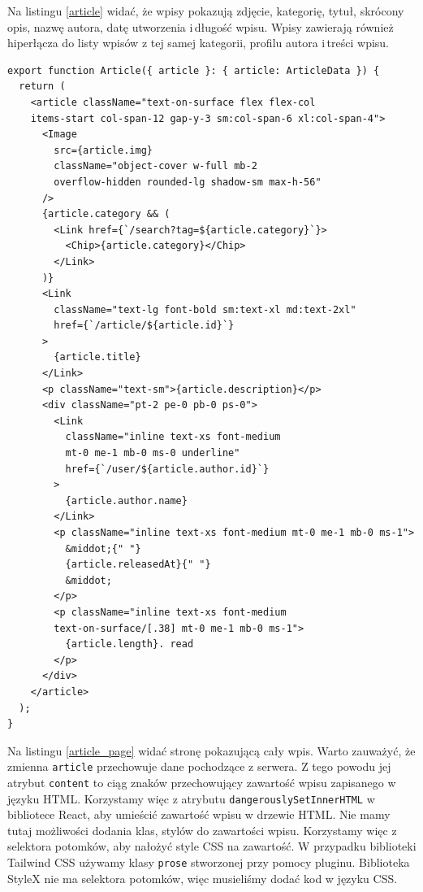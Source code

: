 \documentclass[a4paper,12pt]{book} %
\begin{document}
Na listingu \ref{article} widać, że wpisy pokazują zdjęcie, kategorię, tytuł, skrócony opis, nazwę autora, datę utworzenia i\,długość wpisu. Wpisy zawierają również hiperłącza do listy wpisów z tej samej kategorii, profilu autora i\,treści wpisu.


\begin{lstfloat}[hb]
  \lstset{language=HTML}
  \begin{lstlisting}[frame=single]
export function Article({ article }: { article: ArticleData }) {
  return (
    <article className="text-on-surface flex flex-col
    items-start col-span-12 gap-y-3 sm:col-span-6 xl:col-span-4">
      <Image
        src={article.img}
        className="object-cover w-full mb-2
        overflow-hidden rounded-lg shadow-sm max-h-56"
      />
      {article.category && (
        <Link href={`/search?tag=${article.category}`}>
          <Chip>{article.category}</Chip>
        </Link>
      )}
      <Link
        className="text-lg font-bold sm:text-xl md:text-2xl"
        href={`/article/${article.id}`}
      >
        {article.title}
      </Link>
      <p className="text-sm">{article.description}</p>
      <div className="pt-2 pe-0 pb-0 ps-0">
        <Link
          className="inline text-xs font-medium
          mt-0 me-1 mb-0 ms-0 underline"
          href={`/user/${article.author.id}`}
        >
          {article.author.name}
        </Link>
        <p className="inline text-xs font-medium mt-0 me-1 mb-0 ms-1">
          &middot;{" "}
          {article.releasedAt}{" "}
          &middot;
        </p>
        <p className="inline text-xs font-medium
        text-on-surface/[.38] mt-0 me-1 mb-0 ms-1">
          {article.length}. read
        </p>
      </div>
    </article>
  );
}
\end{lstlisting}
  \caption{Komponent pokazujący wpis}\label{article}
\end{lstfloat}






Na listingu \ref{article_page} widać stronę pokazującą cały wpis. Warto zauważyć, że zmienna \lstinline|article| przechowuje dane pochodzące z serwera. Z tego powodu jej atrybut \lstinline|content| to ciąg znaków przechowujący zawartość wpisu zapisanego w języku HTML. Korzystamy więc z atrybutu \lstinline|dangerouslySetInnerHTML| w bibliotece React, aby umieścić zawartość wpisu w drzewie HTML. Nie mamy tutaj możliwości dodania klas, stylów do zawartości wpisu. Korzystamy więc z selektora potomków, aby nałożyć style CSS na zawartość. W przypadku biblioteki Tailwind CSS używamy klasy \lstinline|prose| stworzonej przy pomocy pluginu. Biblioteka StyleX nie ma selektora potomków, więc musieliśmy dodać kod w języku CSS.
\end{document}
